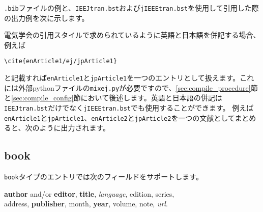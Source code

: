 \documentclass[10pt, a4paper]{jsarticle}
\renewcommand{\refname}{\small 参考文献}
\newcommand{\putlst}[1]{
  \noindent\makebox[\linewidth]{\rule{\linewidth}{0.4pt}}\vspace{-1.5zw}
  \vspace{-1.8zw}
  \noindent\makebox[\linewidth]{\rule{\linewidth}{0.4pt}}\vspace{0.5zw}\par
}
\begin{document}
\texttt{.bib}ファイルの例と、\texttt{IEEJtran.bst}および\texttt{jIEEEtran.bst}を使用して引用した際の出力例を次に示します。

\putlst{article.bib}

\begin{bibunit}[IEEJtran]
  \nocite{Article,jpArticle1,jpArticle2,jpArticle3,enArticle1,enArticle2,enArticle3,enArticle4}
  \renewcommand{\refname}{\small 参考文献(IEEJtran.bst)}
  {\small \putbib[./article]}
\end{bibunit}
\begin{bibunit}[jIEEEtran]
  \nocite{Article,jpArticle1,jpArticle2,jpArticle3,enArticle1,enArticle2,enArticle3,enArticle4}
  \renewcommand{\refname}{\small 参考文献(jIEEEtran.bst)}
  {\small \putbib[./article]}
\end{bibunit}

\vspace{2em}
電気学会の引用スタイルで求められているように英語と日本語を併記する場合、例えば
\begin{center}
  \verb*|\cite{enArticle1/ej/jpArticle1}|
\end{center}
と記載すれば\texttt{enArticle1}と\texttt{jpArticle1}を一つのエントリとして扱えます。これには外部pythonファイルの\texttt{mixej.py}が必要ですので、\ref{sec:compile_procedure}節と\ref{sec:compile_config}節において後述します。英語と日本語の併記は\texttt{IEEJtran.bst}だけでなく\texttt{jIEEEtran.bst}でも使用することができます。
例えば\texttt{enArticle1}と\texttt{jpArticle1}、\texttt{enArticle2}と\texttt{jpArticle2}を一つの文献としてまとめると、次のように出力されます。

\begin{bibunit}[IEEJtran]
  \nocite{enArticle1/ej/jpArticle1,enArticle2/ej/jpArticle2}
  \renewcommand{\refname}{\small 英日を併記した参考文献(IEEJtran.bst)}
  {\small \putbib[./article]}
\end{bibunit}
\begin{bibunit}[jIEEEtran]
  \nocite{enArticle1/ej/jpArticle1,enArticle2/ej/jpArticle2}
  \renewcommand{\refname}{\small 英日を併記した参考文献(jIEEEtran.bst)}
  {\small \putbib[./article]}
\end{bibunit}


\subsection{book}

\texttt{book}タイプのエントリでは次のフィールドをサポートします。

\begin{center}
  \textbf{author} and/or \textbf{editor}, \textbf{title}, \textsl{language}, edition,
  series, \\
  address, \textbf{publisher}, month, \textbf{year}, volume, note, \textsl{url}.
\end{center}
\end{document}
